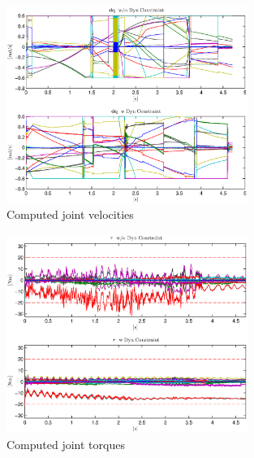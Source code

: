 \begin{figure}
    \vspace{2 mm}
    \centering
        \includegraphics[width=0.7\textwidth]{images/dyn/dq_dyn.eps} 
        \caption{Computed joint velocities}
        \label{dq_dyn}
\end{figure}

\begin{figure}
    \vspace{2 mm}
    \centering
        \includegraphics[width=0.7\textwidth]{images/dyn/tau_dyn.eps}
        \caption{Computed joint torques}
        \label{tau_dyn}
\end{figure}


